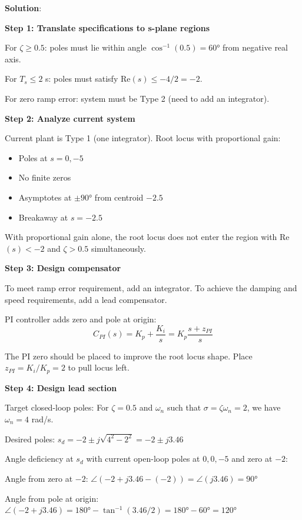 \textbf{Solution}:

\textbf{Step 1: Translate specifications to s-plane regions}

For $\zeta \geq 0.5$: poles must lie within angle $\cos^{-1}(0.5) = 60°$ from negative real axis.

For $T_s \leq 2$ s: poles must satisfy $\text{Re}(s) \leq -4/2 = -2$.

For zero ramp error: system must be Type 2 (need to add an integrator).

\textbf{Step 2: Analyze current system}

Current plant is Type 1 (one integrator). Root locus with proportional gain:
\begin{itemize}
    \item Poles at $s = 0, -5$
    \item No finite zeros
    \item Asymptotes at $\pm 90°$ from centroid $-2.5$
    \item Breakaway at $s = -2.5$
\end{itemize}

With proportional gain alone, the root locus does not enter the region with Re$(s) < -2$ and $\zeta > 0.5$ simultaneously.

\textbf{Step 3: Design compensator}

To meet ramp error requirement, add an integrator. To achieve the damping and speed requirements, add a lead compensator.

PI controller adds zero and pole at origin:
\begin{equation}
C_{PI}(s) = K_p + \frac{K_i}{s} = K_p \frac{s + z_{PI}}{s}
\end{equation}

The PI zero should be placed to improve the root locus shape. Place $z_{PI} = K_i/K_p = 2$ to pull locus left.

\textbf{Step 4: Design lead section}

Target closed-loop poles: For $\zeta = 0.5$ and $\omega_n$ such that $\sigma = \zeta\omega_n = 2$, we have $\omega_n = 4$ rad/s.

Desired poles: $s_d = -2 \pm j\sqrt{4^2 - 2^2} = -2 \pm j3.46$

Angle deficiency at $s_d$ with current open-loop poles at $0, 0, -5$ and zero at $-2$:

Angle from zero at $-2$: $\angle(-2+j3.46 - (-2)) = \angle(j3.46) = 90°$

Angle from pole at origin: $\angle(-2+j3.46) = 180° - \tan^{-1}(3.46/2) = 180° - 60° = 120°$

